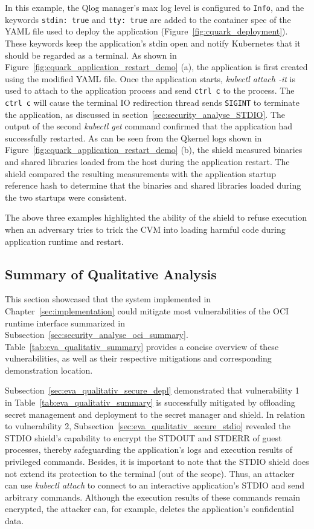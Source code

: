 In this example, the Qlog manager’s max log level is configured to \texttt{Info}, and the keywords \texttt{stdin: true} and \texttt{tty: true} are added to the container spec of the YAML file used to deploy the 
application (Figure~\ref{fig:cquark_deployment}). These keywords keep the application’s stdin open and notify Kubernetes\cite*{k8s} that it should be regarded as a terminal. As shown in Figure~\ref{fig:cquark_application_restart_demo} (a), the application is first created using the modified YAML file. Once the application starts, \emph{kubectl attach -it} is used to 
attach to the application process and send \texttt{ctrl c} to the process. The \texttt{ctrl c} will cause the terminal IO redirection thread sends \texttt{SIGINT} to terminate the application, as discussed in section~\ref{sec:security_analyse_STDIO}. The output of the second \emph{kubectl get} command confirmed that the application had successfully restarted. 
As can be seen from the Qkernel logs shown in Figure~\ref{fig:cquark_application_restart_demo} (b), the shield measured binaries and shared libraries loaded from the host during the application restart. The shield compared the resulting measurements with the application startup reference hash to determine that the binaries and shared libraries loaded during 
the two startups were consistent.


The above three examples highlighted the ability of the shield to refuse execution when an adversary tries to trick the \acrshort{CVM} into loading harmful code during application runtime and restart. 


\subsection{Summary of Qualitative Analysis}
\label{sec:eva_qualitativ_summary}




This section showcased that the system implemented in Chapter~\ref{sec:implementation} could mitigate most vulnerabilities of the OCI runtime interface summarized in Subsection~\ref{sec:security_analyse_oci_summary}. Table~\ref{tab:eva_qualitativ_summary} provides a concise overview of 
these vulnerabilities, as well as their respective mitigations and corresponding demonstration location.

Subsection~\ref{sec:eva_qualitativ_secure_depl} demonstrated that vulnerability 1 in Table~\ref{tab:eva_qualitativ_summary} is successfully mitigated by offloading secret management and deployment to the secret manager and shield. In relation to vulnerability 2, 
Subsection~\ref{sec:eva_qualitativ_secure_stdio} revealed the STDIO shield's capability to encrypt the STDOUT and STDERR of guest processes, thereby safeguarding the application's logs and execution results of privileged commands. Besides, it is important to note that the STDIO 
shield does not extend its protection to the terminal (out of the scope). Thus, an attacker can use \emph{kubectl attach} to connect to an interactive application's STDIO and send arbitrary commands. Although the execution results of these commands remain encrypted, 
the attacker can, for example, deletes the application's confidential data. 


